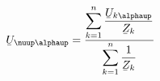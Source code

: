 \hfill
\begin{minipage}[b]{7cm}
    
    \label{pic:Millman}
\end{minipage}
\hfill
\begin{minipage}[b][4.5cm][t]{6cm}
    \begin{equation}
        \cmplx{U}_{\nuup\alphaup} = \frac{\displaystyle\sum_{k=1}^n \dfrac{\cmplx{U}_{k\alphaup}}{\cmplx{Z}_k}} {\displaystyle\sum_{k=1}^n \dfrac{1}{\cmplx{Z}_k}}
        \label{eq:millman}
    \end{equation}
\end{minipage}

\vspace{5mm}


